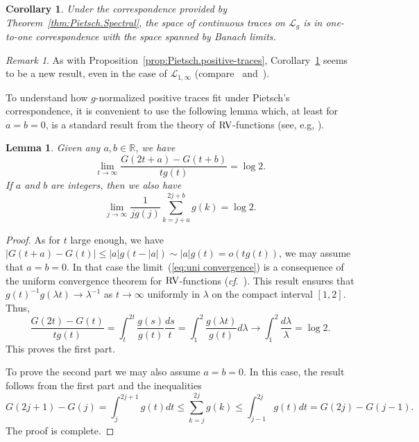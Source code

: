 \documentclass[10pt, a4paper]{amsart}
\newcommand{\R}{\mathbb{R}}
\newcommand{\sL}{\mathscr{L}}
\numberwithin{equation}{section}
\newtheorem{corollary}[theorem]{Corollary}
\newtheorem{lemma}[theorem]{Lemma}
\theoremstyle{definition}
\theoremstyle{remark}
\newtheorem{remark}[theorem]{Remark}
\newcommand{\RV}{\textup{RV}}
\begin{document}
\begin{corollary}\label{cor:Pietsch.continuous-traces}
 Under the correspondence provided by Theorem~\ref{thm:Pietsch.Spectral}, the space of continuous traces on $\sL_g$ is in one-to-one correspondence with the space spanned by
 Banach limits.
 \end{corollary}

\begin{remark}
 As with Proposition~\ref{prop:Pietsch.positive-traces}, Corollary~\ref{cor:Pietsch.continuous-traces} seems to be a new result, even in the case of $\sL_{1,\infty}$ (compare~\cite[Theorem~6.3.1(f)]{LSZ:Book} and~\cite[Theorem~3.5]{LU:JMAA25}).
\end{remark}

To understand how $g$-normalized positive traces fit under Pietsch's correspondence, it is convenient to use the following lemma which, at least for $a=b=0$,  is a standard result from the theory of $\RV$-functions (see, e.g, \cite[Chapter~3]{BGT:Cambridge87}).

\begin{lemma}\label{lem:auxiliary result} Given any $a,b\in \R$, we have
 \begin{equation*}
 \lim_{t\rightarrow \infty} \frac{G(2t+a)-G(t+b)}{tg(t)}= \log 2.
\end{equation*}
If $a$ and $b$ are integers, then we also have
\begin{equation}\label{eq:uni convergence}
 \lim_{j\rightarrow \infty} \frac{1}{jg(j)} \sum_{k=j+a}^{2j+b} g(k)= \log 2.
\end{equation}
\end{lemma}
\begin{proof}
 As for $t$ large enough, we have $|G(t+a)-G(t)|\leq |a|g(t-|a|)\sim |a|g(t)=o(tg(t))$, we may assume that $a=b=0$. In that case the limit~(\ref{eq:uni convergence}) is a consequence of the uniform convergence theorem for $\RV$-functions (\emph{cf}.~\cite[Remark~2.16]{PT:Part1}). This result ensures that $g(t)^{-1}g(\lambda t)\rightarrow \lambda^{-1}$ as $t\rightarrow \infty$ uniformly in $\lambda$ on the compact interval $[1,2]$. Thus,
 \begin{equation*}
 \frac{G(2t)-G(t)}{tg(t)}= \int_t^{2t} \frac{g(s)}{g(t)}\frac{ds}{t}=\int_1^2 \frac{g(\lambda t)}{g(t)} d\lambda \longrightarrow \int_1^2 \frac{d\lambda}{\lambda}=\log 2.
\end{equation*}
 This proves the first part.

 To prove the second part we may also assume $a=b=0$. In this case, the result follows from the first part and the inequalities
 \begin{equation*}
 G(2j+1)-G(j)=\int_{j}^{2j+1}\!\!\! g(t)dt \leq \sum_{k=j}^{2j} g(k) \leq \int_{j-1}^{2j}\!\!\! g(t)dt=G(2j)-G(j-1).
\end{equation*}
The proof is complete.
 \end{proof}
\end{document}
